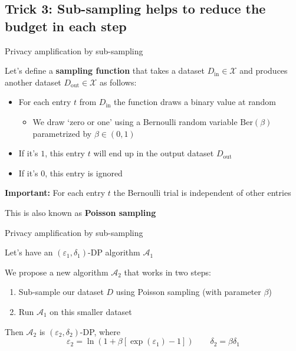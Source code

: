 \documentclass[12pt,aspectratio=169,handout]{beamer}
\begin{document}
\subsection{Trick 3: Sub-sampling helps to reduce the budget in each step}


\begin{frame}{Privacy amplification by sub-sampling}

Let's define a \textbf{sampling function} that takes a dataset $D_{\mathrm{in}} \in \mathcal{X}$ and produces another dataset $D_{\mathrm{out}} \in \mathcal{X}$ as follows:

\begin{itemize}
\item For each entry $t$ from $D_{\mathrm{in}}$ the function draws a binary value at random
\begin{itemize}
\item We draw `zero or one' using a Bernoulli random variable $\mathrm{Ber}(\beta)$ parametrized by $\beta \in (0, 1)$
\end{itemize}
\item If it's $1$, this entry $t$ will end up in the output dataset $D_{\mathrm{out}}$
\item If it's $0$, this entry is ignored
\end{itemize}

\textbf{Important:} For each entry $t$ the Bernoulli trial is independent of other entries

This is also known as \textbf{Poisson sampling}

\end{frame}

\begin{frame}{Privacy amplification by sub-sampling}

Let's have an $(\varepsilon_1, \delta_1)$-DP algorithm $\mathcal{A}_1$

We propose a new algorithm $\mathcal{A}_2$ that works in two steps:
\begin{enumerate}
\item Sub-sample our dataset $D$ using Poisson sampling (with parameter $\beta$)
\item Run $\mathcal{A}_1$ on this smaller dataset
\end{enumerate}

Then $\mathcal{A}_2$ is $(\varepsilon_2, \delta_2)$-DP, where
$$
\varepsilon_2 = \ln \left(
1 + \beta \left[
\exp(\varepsilon_1) - 1 \right]
\right)
\qquad
\delta_2 = \beta \delta_1
$$



\end{frame}
\end{document}
